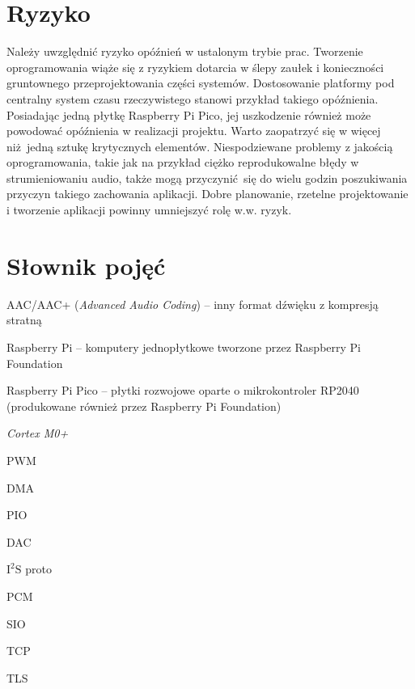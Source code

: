 \documentclass[12pt]{report}
\let\tempone\itemize
\let\temptwo\enditemize
\renewenvironment{itemize}{\tempone\setlength{\itemsep}{0cm}}{\temptwo}
\newcommand{\isqs}{$\text{I}^{2}\text{S}$}
\begin{document}
	\section{Ryzyko}
		Należy uwzględnić ryzyko opóźnień w ustalonym trybie prac. Tworzenie oprogramowania wiąże się z ryzykiem dotarcia w ślepy zaułek i konieczności gruntownego przeprojektowania części systemów. Dostosowanie platformy pod centralny system czasu rzeczywistego stanowi przykład takiego opóźnienia. Posiadając jedną płytkę Raspberry Pi Pico, jej uszkodzenie również może powodować opóźnienia w realizacji projektu. Warto zaopatrzyć się w więcej niż jedną sztukę krytycznych elementów. Niespodziewane problemy z jakością oprogramowania, takie jak na przykład ciężko reprodukowalne błędy w strumieniowaniu audio, także mogą przyczynić się do wielu godzin poszukiwania przyczyn takiego zachowania aplikacji.
		Dobre planowanie, rzetelne projektowanie i tworzenie aplikacji powinny umniejszyć rolę w.w. ryzyk.
	
	\section{Słownik pojęć}
		\begin{itemize}
			\item AAC/AAC+ (\textit{Advanced Audio Coding}) -- inny format dźwięku z kompresją stratną
			\item Raspberry Pi -- komputery jednopłytkowe tworzone przez Raspberry Pi Foundation
			\item Raspberry Pi Pico -- płytki rozwojowe oparte o mikrokontroler RP2040 (produkowane również przez Raspberry Pi Foundation)
			\item \textit{Cortex M0+}
			\item PWM
			\item DMA
			\item PIO
			\item DAC
			\item \isqs{} proto
			\item PCM
			\item SIO
			\item TCP
			\item TLS
		\end{itemize}
	
\end{document}
